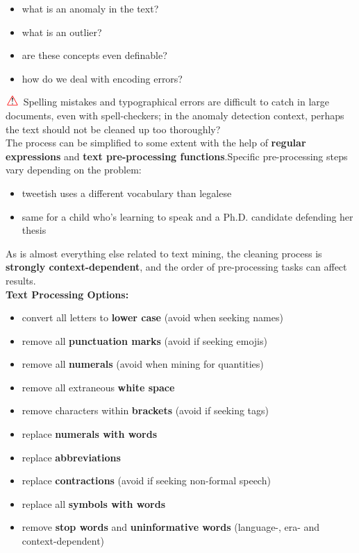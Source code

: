\documentclass[20pt,landscape,footrule,headrule]{foils}
\newcommand{\newl}{\newline\newline}
\newcommand\Warning{%
 \makebox[1.4em][c]{%
 \makebox[0pt][c]{\raisebox{.1em}{!}}%
 \makebox[0pt][c]{\color{red}\Large$\bigtriangleup$}}}%
\begin{document}
{{\begin{itemize}
\item what is an anomaly in the text?
\item what is an outlier?
\item are these concepts even definable?
\item how do we deal with encoding errors?
\end{itemize}
$\Warning$ Spelling mistakes and typographical errors are difficult to catch in large documents, even with spell-checkers; in the anomaly detection context, perhaps the text should not be cleaned up too thoroughly? 
\newpage\ \\ \noindent The process can be simplified to some extent with the help of \textbf{regular expressions} and \textbf{text pre-processing functions}.\newl Specific pre-processing steps vary depending on the problem:
\begin{itemize}
\item tweetish uses a different vocabulary than legalese
\item same for a child who’s learning to speak and a Ph.D. candidate defending her thesis
\end{itemize}
As is almost everything else related to text mining, the cleaning process is \textbf{strongly context-dependent}, and the order of pre-processing tasks can affect results.\newpage\ \\ \noindent \textbf{Text Processing Options:}
\begin{itemize}
\item convert all letters to \textbf{lower case} (avoid when seeking names)
\item remove all \textbf{punctuation marks} (avoid if seeking emojis)
\item remove all \textbf{numerals} (avoid when mining for quantities)
\item remove all extraneous \textbf{white space}
\item remove characters within \textbf{brackets} (avoid if seeking tags)
\item replace \textbf{numerals with words}
\item replace \textbf{abbreviations}  
\newpage\ \item replace \textbf{contractions} (avoid if seeking non-formal speech)
\item replace all \textbf{symbols with words}
\item remove \textbf{stop words} and \textbf{uninformative words} (language-, era- and context-dependent)

\end{itemize}}}
\end{document}
